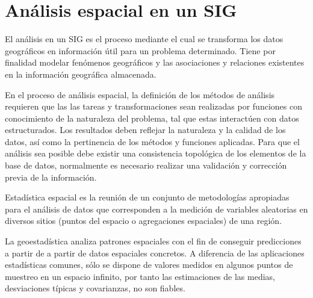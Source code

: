 \section{Análisis espacial en un SIG}
\label{sec:cap2-analisis-espacial-sig}

El análisis en un SIG es el proceso mediante el cual se transforma los datos geográficos en información útil
para un problema determinado. Tiene por finalidad modelar fenómenos geográficos y las asociaciones y relaciones
existentes en la información geográfica almacenada.

En el proceso de análisis espacial, la definición de los métodos de análisis requieren que las las tareas y transformaciones
sean realizadas por funciones con conocimiento de la naturaleza del problema, tal que estas interactúen con datos
estructurados. Los resultados deben reflejar la naturaleza y la calidad de los datos, así como la pertinencia de los métodos
y funciones aplicadas. Para que el análisis sea posible debe existir una consistencia topológica de los elementos de la
base de datos, normalmente es necesario realizar una validación y corrección previa de la información.

Estadística espacial es la reunión de un conjunto de metodologías apropiadas para el análisis de datos que corresponden
a la medición de variables aleatorias en diversos sitios (puntos del espacio o agregaciones espaciales) de una
región\cite{rgeraldoGeoestasistica}.

La geoestadística analiza patrones espaciales con el fin de conseguir predicciones a partir de
a partir de datos espaciales concretos. A diferencia de las aplicaciones estadísticas comunes, sólo se dispone de valores
medidos en algunos puntos de muestreo en un espacio infinito, por tanto las estimaciones de las medias, desviaciones típicas
y covarianzas, no son fiables.
